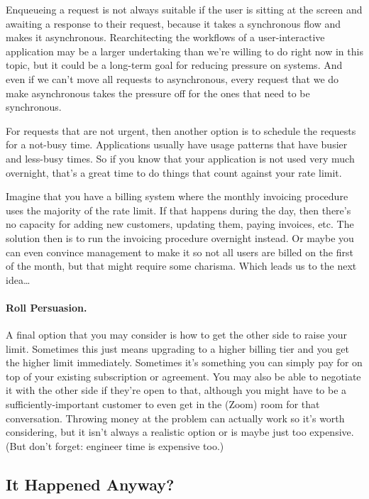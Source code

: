 Enqueueing a request is not always suitable if the user is sitting at the screen and awaiting a response to their request, because it takes a synchronous flow and makes it asynchronous. Rearchitecting the workflows of a user-interactive application may be a larger undertaking than we're willing to do right now in this topic, but it could be a long-term goal for reducing pressure on systems. And even if we can't move all requests to asynchronous, every request that we do make asynchronous takes the pressure off for the ones that need to be synchronous.

For requests that are not urgent, then another option is to schedule the requests for a not-busy time. Applications usually have usage patterns that have busier and less-busy times. So if you know that your application is not used very much overnight, that's a great time to do things that count against your rate limit. 

Imagine that you have a billing system where the monthly invoicing procedure uses the majority of the rate limit. If that happens during the day, then there's no capacity for adding new customers, updating them, paying invoices, etc. The solution then is to run the invoicing procedure overnight instead. Or maybe you can even convince management to make it so not all users are billed on the first of the month, but that might require some charisma. Which leads us to the next idea\ldots

\paragraph{Roll Persuasion.}
A final option that you may consider is how to get the other side to raise your limit. Sometimes this just means upgrading to a higher billing tier and you get the higher limit immediately. Sometimes it's something you can simply pay for on top of your existing subscription or agreement. You may also be able to negotiate it with the other side if they're open to that, although you might have to be a sufficiently-important customer to even get in the (Zoom) room for that conversation. Throwing money at the problem can actually work so it's worth considering, but it isn't always a realistic option or is maybe just too expensive. (But don't forget: engineer time is expensive too.)

\subsection*{It Happened Anyway?}

